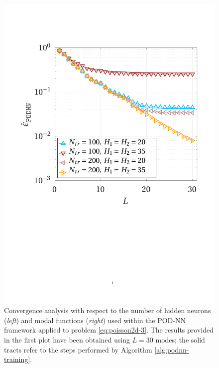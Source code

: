 \documentclass[12pt, a4paper, twoside, openright, notitlepage]{report}
\numberwithin{equation}{chapter}
\theoremstyle{theorem}
\theoremstyle{definition}
\theoremstyle{remark}
\theoremstyle{proposition}
\numberwithin{figure}{chapter}
\begin{document}
\begin{figure}[H]
			\includegraphics[scale = 0.425, trim = {1.5cm 9.8cm 1.5cm 3.5cm}, clip]{poisson2d_3_nn_comparison}
						
			\caption{Convergence analysis with respect to the number of hidden neurons (\emph{left}) and modal functions (\emph{right}) used within the POD-NN framework applied to problem \eqref{eq:poisson2d-3}. The results provided in the first plot have been obtained using $L = 30$ modes; the solid tracts refer to the steps performed by Algorithm \ref{alg:podnn-training}.}
			\label{fig:poisson2d-3-fig3}
		\end{figure}	
		
\end{document}
